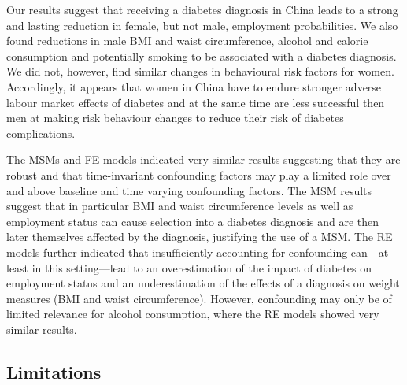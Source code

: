 Our results suggest that receiving a diabetes diagnosis in China leads to a strong and lasting reduction in female, but not male, employment probabilities. We also found reductions in male \ac{BMI} and waist circumference, alcohol and calorie consumption and potentially smoking to be associated with a diabetes diagnosis. We did not, however, find similar changes in behavioural risk factors for women. Accordingly, it appears that women in China have to endure stronger adverse labour market effects of diabetes and at the same time are less successful then men at making risk behaviour changes to reduce their risk of diabetes complications.

The \DIFdelbegin %
\DIFdelend \DIFaddbegin \acp{MSM} \DIFaddend and \ac{FE} models indicated very similar results suggesting that they are robust and that time-invariant confounding factors may play a limited role over and above baseline and time varying confounding factors. The \ac{MSM} results suggest that in particular \ac{BMI} and waist circumference levels as well as employment status can cause selection into a diabetes diagnosis and are then later themselves affected by the diagnosis, justifying the use of a \ac{MSM}. The \ac{RE} models further indicated that insufficiently accounting for confounding can---at least in this setting---lead to an overestimation of the impact of diabetes on employment status and an underestimation of the effects of a diagnosis on weight measures (\ac{BMI} and waist circumference). However, confounding may only be of limited relevance for  alcohol consumption, where the \ac{RE} models showed very similar results.

\subsection{Limitations}

